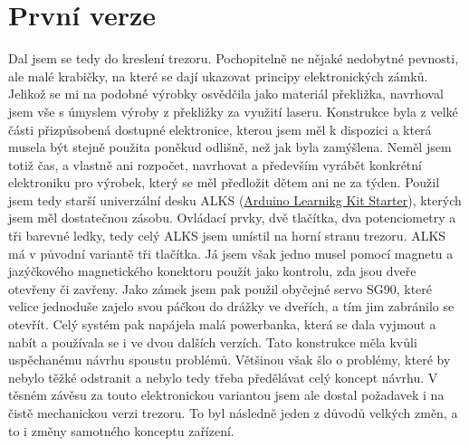 \section{První verze}

Dal jsem se tedy do kreslení trezoru. Pochopitelně ne nějaké nedobytné pevnosti, ale malé
krabičky,   %
na které se dají ukazovat principy elektronických zámků. Jelikož se mi na podobné
výrobky osvědčila jako materiál překližka, navrhoval jsem vše s úmyslem výroby z překližky 
za využití laseru. Konstrukce byla z velké části přizpůsobená dostupné elektronice, kterou 
jsem měl k dispozici a která musela být stejně použita poněkud odlišně, než jak byla zamýšlena. %
Neměl jsem totiž čas, a vlastně ani rozpočet, navrhovat a především vyrábět konkrétní elektroniku
pro výrobek, který se měl předložit dětem ani ne za týden. %
Použil jsem tedy starší univerzální 
desku ALKS (\href{https://github.com/RoboticsBrno/ArduinoLearningKitStarter}{Arduino Learnikg Kit Starter}), 
kterých jsem měl dostatečnou zásobu. Ovládací prvky, %
dvě tlačítka, dva potenciometry a tři
barevné ledky, tedy celý ALKS jsem umístil na horní stranu trezoru. ALKS má v původní variantě
tři tlačítka. Já jsem však jedno musel pomocí magnetu a jazýčkového magnetického konektoru použít
jako kontrolu, zda jsou dveře otevřeny či zavřeny. Jako zámek jsem pak použil obyčejné servo
SG90, které velice jednoduše zajelo svou páčkou do drážky ve dveřích, a tím jim zabránilo 
se otevřít. Celý systém pak napájela malá powerbanka, která se dala vyjmout a nabít  
a používala se i ve dvou dalších verzích. Tato konstrukce měla kvůli uspěchanému návrhu 
spoustu problémů. Většinou však šlo o problémy, které by nebylo těžké odstranit a nebylo
tedy třeba předělávat celý koncept návrhu. V těsném závěsu za touto elektronickou variantou
jsem ale dostal požadavek i na čistě mechanickou verzi trezoru. To byl následně jeden z 
 důvodů velkých změn, a to i změny samotného konceptu zařízení.

\newpage